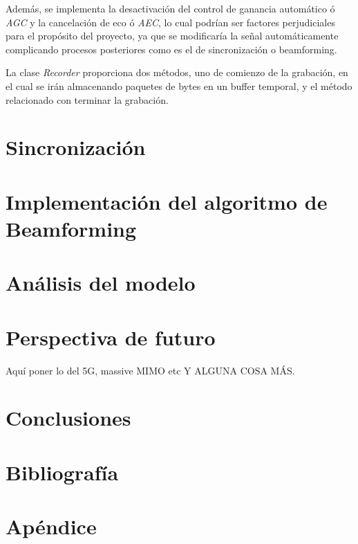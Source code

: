 \documentclass[a4paper,11pt]{book}
\begin{document}
\begin{itemize}
	Además, se implementa la desactivación del control de ganancia automático ó \textit{AGC} y la cancelación de eco ó \textit{AEC}, lo cual podrían ser factores perjudiciales para el propósito del proyecto, ya que se modificaría la señal automáticamente complicando procesos posteriores como es el de sincronización o beamforming.
	
	La clase \textit{Recorder} proporciona dos métodos, uno de comienzo de la grabación, en el cual se irán almacenando paquetes de bytes en un buffer temporal, y el método relacionado con terminar la grabación.
	\end{itemize}
	
	
	
\chapter{Sincronización}

\chapter{Implementación del algoritmo de Beamforming}

\chapter{Análisis del modelo}

\chapter{Perspectiva de futuro}
Aquí poner lo del 5G, massive MIMO etc Y ALGUNA COSA MÁS.
\chapter{Conclusiones}

\chapter{Bibliografía}

\chapter{Apéndice}





%
%
%
%
%
%
%
%
%
%
%
%
%
%
%
%
%
%
%
%
%
%
\chapter*{}
\thispagestyle{empty}
\end{document}
